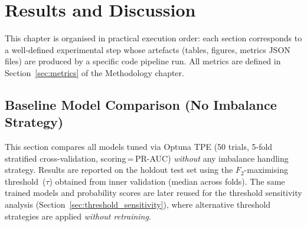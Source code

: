 \chapter{Results and Discussion}
\label{sec:chapterResults}




This chapter is organised in practical execution order:
each section corresponds to a well-defined experimental step whose artefacts (tables, figures, metrics JSON files) are produced by a specific code pipeline run.
All metrics are defined in Section~\ref{sec:metrics} of the Methodology chapter.


\section{Baseline Model Comparison (No Imbalance Strategy)}
\label{sec:baseline_results}

This section compares all models tuned via Optuna TPE (50 trials,
5-fold stratified cross-validation, scoring\,=\,PR-AUC)
\emph{without} any imbalance handling strategy.
Results are reported on the holdout test set using the
$F_2$-maximising threshold~($\tau$) obtained from inner validation
(median across folds).
The same trained models and probability scores are later reused for
the threshold sensitivity analysis (Section~\ref{sec:threshold_sensitivity}),
where alternative threshold strategies are applied \emph{without retraining}.

